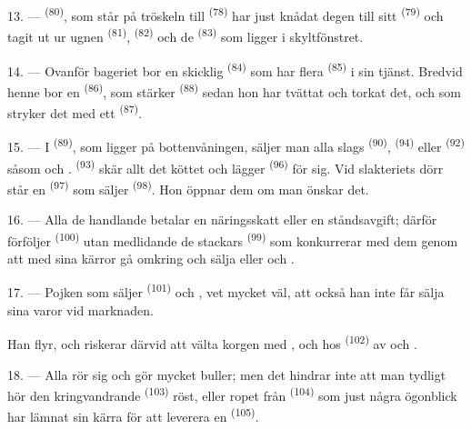 13. ---  \textsuperscript{(80)}, som står på tröskeln till
 \textsuperscript{(78)} har just knådat degen till sitt
 \textsuperscript{(79)} och tagit ut ur ugnen 
\textsuperscript{(81)},  \textsuperscript{(82)} och de
 \textsuperscript{(83)} som ligger i skyltfönstret.

14. --- Ovanför bageriet bor en skicklig  \textsuperscript{(84)} som
har flera  \textsuperscript{(85)} i sin tjänst. Bredvid henne bor en
 \textsuperscript{(86)}, som stärker 
\textsuperscript{(88)} sedan hon har tvättat och torkat det, och som stryker det med ett
 \textsuperscript{(87)}.

\VUsaut{4.0mm}
\VUsaut{3.0mm}

15. --- I  \textsuperscript{(89)}, som ligger på bottenvåningen, säljer man
alla slags  \textsuperscript{(90)}, 
\textsuperscript{(94)} eller
 \textsuperscript{(92)} såsom  och .  \textsuperscript{(93)} skär allt det
köttet och lägger  \textsuperscript{(96)} för sig. Vid slakteriets dörr står
en  \textsuperscript{(97)} som säljer 
\textsuperscript{(98)}. Hon öppnar dem om man önskar det.

16. --- Alla de handlande betalar en näringsskatt eller en ståndsavgift; därför förföljer
 \textsuperscript{(100)} utan medlidande de stackars
 \textsuperscript{(99)} som konkurrerar med dem genom att med
sina kärror gå omkring och sälja  eller
 och .

\VUsaut{4.0mm}
\VUsaut{3.0mm}

17. --- Pojken som säljer  \textsuperscript{(101)} och
, vet mycket väl, att också han inte får sälja sina varor vid
marknaden.

Han flyr, och riskerar därvid att välta korgen med ,
 och  hos 
\textsuperscript{(102)} av  och .

18. --- Alla rör sig och gör mycket buller; men det hindrar inte att man tydligt hör den
kringvandrande  \textsuperscript{(103)} röst, eller ropet från
 \textsuperscript{(104)} som just några ögonblick har lämnat sin kärra
för att leverera en  \textsuperscript{(105)}.

\VUsaut{6.0mm}
\VUfilet{22mm}
